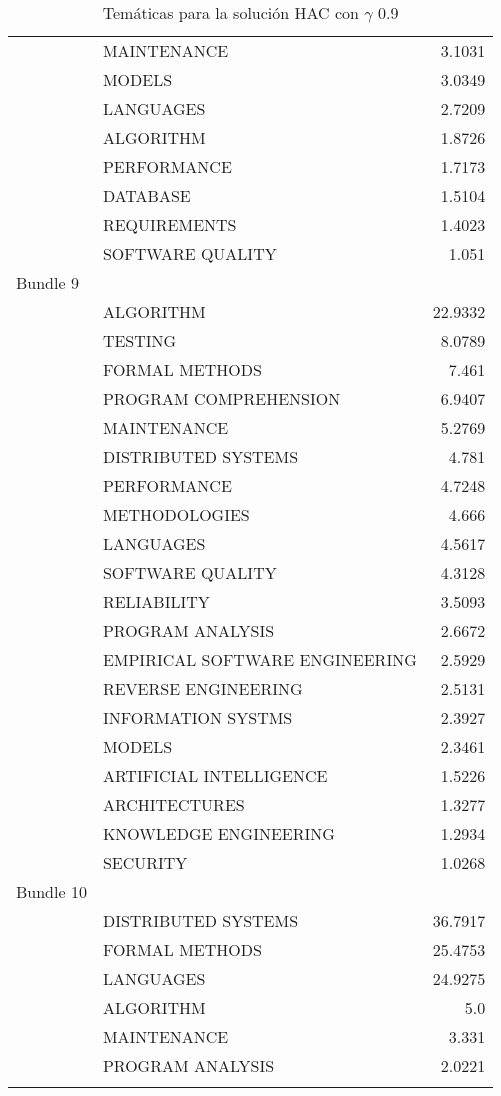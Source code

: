 \begin{center}
\begin{longtable}{|llr|}
	~ & MAINTENANCE & 3.1031 \\
	~ & MODELS & 3.0349 \\
	~ & LANGUAGES & 2.7209 \\
	~ & ALGORITHM & 1.8726 \\
	~ & PERFORMANCE & 1.7173 \\
	~ & DATABASE & 1.5104 \\
	~ & REQUIREMENTS & 1.4023 \\
	~ & SOFTWARE QUALITY & 1.051 \\
	Bundle 9 & ~ & ~  \\
	~ & ALGORITHM & 22.9332 \\
	~ & TESTING & 8.0789 \\
	~ & FORMAL METHODS & 7.461 \\
	~ & PROGRAM COMPREHENSION & 6.9407 \\
	~ & MAINTENANCE & 5.2769 \\
	~ & DISTRIBUTED SYSTEMS & 4.781 \\
	~ & PERFORMANCE & 4.7248 \\
	~ & METHODOLOGIES & 4.666 \\
	~ & LANGUAGES & 4.5617 \\
	~ & SOFTWARE QUALITY & 4.3128 \\
	~ & RELIABILITY & 3.5093 \\
	~ & PROGRAM ANALYSIS & 2.6672 \\
	~ & EMPIRICAL SOFTWARE ENGINEERING & 2.5929 \\
	~ & REVERSE ENGINEERING & 2.5131 \\
	~ & INFORMATION SYSTMS & 2.3927 \\
	~ & MODELS & 2.3461 \\
	~ & ARTIFICIAL INTELLIGENCE & 1.5226 \\
	~ & ARCHITECTURES & 1.3277 \\
	~ & KNOWLEDGE ENGINEERING & 1.2934 \\
	~ & SECURITY & 1.0268 \\
	Bundle 10 & ~ & ~  \\
	~ & DISTRIBUTED SYSTEMS & 36.7917 \\
	~ & FORMAL METHODS & 25.4753 \\
	~ & LANGUAGES & 24.9275 \\
	~ & ALGORITHM & 5.0 \\
	~ & MAINTENANCE & 3.331 \\
	~ & PROGRAM ANALYSIS & 2.0221 \\
    \hline
  \caption {Temáticas para la solución HAC con $\gamma$ 0.9}
\end{longtable}
\end{center}